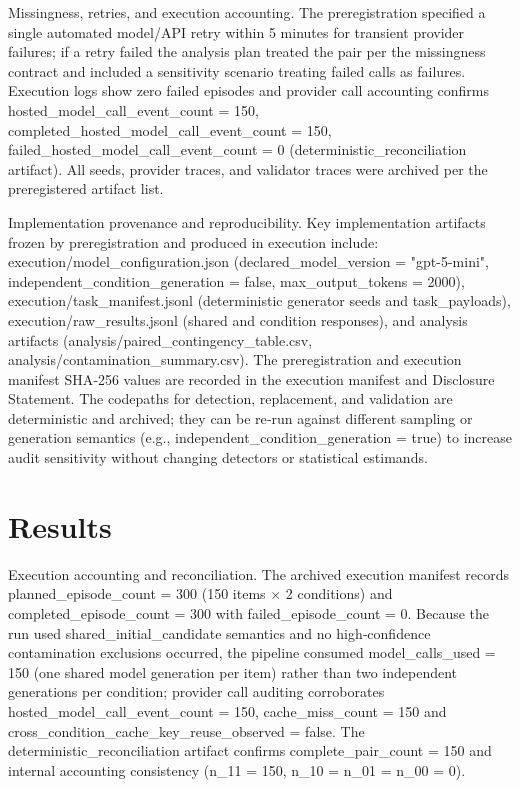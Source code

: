 \documentclass[conference]{IEEEtran}
\begin{document}
Missingness, retries, and execution accounting. The preregistration specified a single automated model/API retry within 5 minutes for transient provider failures; if a retry failed the analysis plan treated the pair per the missingness contract and included a sensitivity scenario treating failed calls as failures. Execution logs show zero failed episodes and provider call accounting confirms hosted\_model\_call\_event\_count = 150, completed\_hosted\_model\_call\_event\_count = 150, failed\_hosted\_model\_call\_event\_count = 0 (deterministic\_reconciliation artifact). All seeds, provider traces, and validator traces were archived per the preregistered artifact list.

Implementation provenance and reproducibility. Key implementation artifacts frozen by preregistration and produced in execution include: execution/model\_configuration.json (declared\_model\_version = "gpt-5-mini", independent\_condition\_generation = false, max\_output\_tokens = 2000), execution/task\_manifest.jsonl (deterministic generator seeds and task\_payloads), execution/raw\_results.jsonl (shared and condition responses), and analysis artifacts (analysis/paired\_contingency\_table.csv, analysis/contamination\_summary.csv). The preregistration and execution manifest SHA‑256 values are recorded in the execution manifest and Disclosure Statement. The codepaths for detection, replacement, and validation are deterministic and archived; they can be re‑run against different sampling or generation semantics (e.g., independent\_condition\_generation = true) to increase audit sensitivity without changing detectors or statistical estimands.

\section{Results}
Execution accounting and reconciliation. The archived execution manifest records planned\_episode\_count = 300 (150 items \ensuremath{\times} 2 conditions) and completed\_episode\_count = 300 with failed\_episode\_count = 0. Because the run used shared\_initial\_candidate semantics and no high‑confidence contamination exclusions occurred, the pipeline consumed model\_calls\_used = 150 (one shared model generation per item) rather than two independent generations per condition; provider call auditing corroborates hosted\_model\_call\_event\_count = 150, cache\_miss\_count = 150 and cross\_condition\_cache\_key\_reuse\_observed = false. The deterministic\_reconciliation artifact confirms complete\_pair\_count = 150 and internal accounting consistency (n\_11 = 150, n\_10 = n\_01 = n\_00 = 0).
\end{document}
